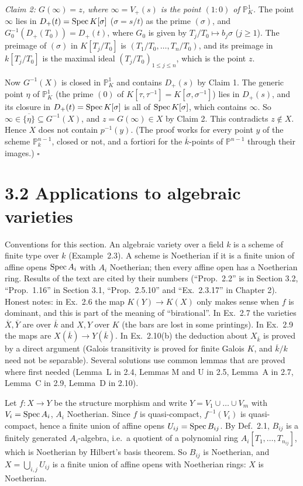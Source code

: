 \documentclass[11pt]{article}
\begin{document}
\emph{Claim 2: $G(\infty)=z$, where $\infty=V_+(s)$ is the point $(1:0)$ of $\mathbb P^1_K$.} The point $\infty$ lies in $D_+(t)=\operatorname{Spec} K[\sigma]$ ($\sigma=s/t$) as the prime $(\sigma)$, and $G_0^{-1}(D_+(T_0))=D_+(t)$, where $G_0$ is given by $T_j/T_0\mapsto b_j\sigma$ ($j\ge1$). The preimage of $(\sigma)$ in $K[T_j/T_0]$ is $(T_1/T_0,\dots,T_n/T_0)$, and its preimage in $k[T_j/T_0]$ is the maximal ideal $(T_j/T_0)_{1\le j\le n}$, which is the point $z$.

Now $G^{-1}(X)$ is closed in $\mathbb P^1_K$ and contains $D_+(s)$ by Claim 1. The generic point $\eta$ of $\mathbb P^1_K$ (the prime $(0)$ of $K[\tau,\tau^{-1}]=K[\sigma,\sigma^{-1}]$) lies in $D_+(s)$, and its closure in $D_+(t)=\operatorname{Spec} K[\sigma]$ is all of $\operatorname{Spec} K[\sigma]$, which contains $\infty$. So $\infty\in\overline{\{\eta\}}\subseteq G^{-1}(X)$, and $z=G(\infty)\in X$ by Claim 2. This contradicts $z\notin X$. Hence $X$ does not contain $p^{-1}(y)$. (The proof works for every point $y$ of the scheme $\mathbb P^{n-1}_k$, closed or not, and a fortiori for the $\overline k$-points of $\mathbb P^{n-1}$ through their images.) \hfill$\square$

\section*{3.2 Applications to algebraic varieties}

Conventions for this section. An algebraic variety over a field $k$ is a scheme of finite type over $k$ (Example~2.3). A scheme is Noetherian if it is a finite union of affine opens $\operatorname{Spec} A_i$ with $A_i$ Noetherian; then every affine open has a Noetherian ring. Results of the text are cited by their numbers (``Prop.~2.2'' is in Section 3.2, ``Prop.~1.16'' in Section 3.1, ``Prop.~2.5.10'' and ``Ex.~2.3.17'' in Chapter 2). Honest notes: in Ex.~2.6 the map $K(Y)\to K(X)$ only makes sense when $f$ is dominant, and this is part of the meaning of ``birational''. In Ex.~2.7 the varieties $\overline X,\overline Y$ are over $\overline k$ and $X,Y$ over $K$ (the bars are lost in some printings). In Ex.~2.9 the maps are $X(\overline k)\to Y(\overline k)$. In Ex.~2.10(b) the deduction about $X_{\overline k}$ is proved by a direct argument (Galois transitivity is proved for finite Galois $K$, and $\overline k/k$ need not be separable). Several solutions use common lemmas that are proved where first needed (Lemma~L in 2.4, Lemmas M and U in 2.5, Lemma~A in 2.7, Lemma~C in 2.9, Lemma~D in 2.10).

\pf
Let $f:X\to Y$ be the structure morphism and write $Y=V_1\cup\dots\cup V_m$ with $V_i=\operatorname{Spec} A_i$, $A_i$ Noetherian. Since $f$ is quasi-compact, $f^{-1}(V_i)$ is quasi-compact, hence a finite union of affine opens $U_{ij}=\operatorname{Spec} B_{ij}$. By Def.~2.1, $B_{ij}$ is a finitely generated $A_i$-algebra, i.e.\ a quotient of a polynomial ring $A_i[T_1,\dots,T_{n_{ij}}]$, which is Noetherian by Hilbert's basis theorem. So $B_{ij}$ is Noetherian, and $X=\bigcup_{i,j}U_{ij}$ is a finite union of affine opens with Noetherian rings: $X$ is Noetherian.
\end{document}
